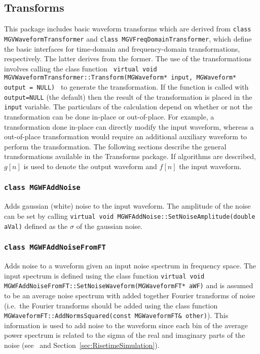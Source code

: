 		\subsection{Transforms}
		
	This package includes basic waveform transforms which are derived from \lstinline!class MGVWaveformTransformer!  and \lstinline!class MGVFreqDomainTransformer!, which define the basic interfaces for time-domain and  frequency-domain transformations, respectively.  The latter derives from the former.  The use of the transformations involves calling the class function
\lstinline! virtual void MGVWaveformTransformer::Transform(MGWaveform* input, MGWaveform* output = NULL) ! to generate the transformation.  If the function is called with \lstinline!output=NULL! (the default) then the result of the transformation is placed in the \lstinline!input! variable.  The particulars of the calculation depend on whether or not the transformation can be done in-place or out-of-place.  For example, a transformation done in-place can directly modify the input waveform, whereas a out-of-place transformation would require an additional auxiliary waveform to perform the transformation.  The following sections describe the general transformations available in the Transforms package.  If algorithms are described, $g[n]$ is used to denote the output waveform and $f[n]$ the input waveform.
	
	
			\subsubsection{\lstinline!class MGWFAddNoise!}
	Adds gaussian (white) noise to the input waveform.  The amplitude of the noise can be set by calling \lstinline!virtual void MGWFAddNoise::SetNoiseAmplitude(double aVal)! defined as the $\sigma$ of the gaussian noise.  
			
			\subsubsection{\lstinline!class MGWFAddNoiseFromFT!}
Adds noise to a waveform given an input noise spectrum in frequency space.  The input spectrum is defined using the class function \lstinline!virtual void MGWFAddNoiseFromFT::SetNoiseWaveform(MGWaveformFT* aWF)! and is assumed
to be an average noise spectrum with added together Fourier transforms of noise (i.e.~the Fourier transforms should be added using the class function \lstinline!MGWaveformFT::AddNormsSquared(const MGWaveformFT& other)!).  This information is used to add noise to the waveform since each bin of the average power spectrum is related to the sigma of the real and imaginary
parts of the noise (see~\cite{WanThesis08} and Section~\ref{sec:RisetimeSimulation}).  

